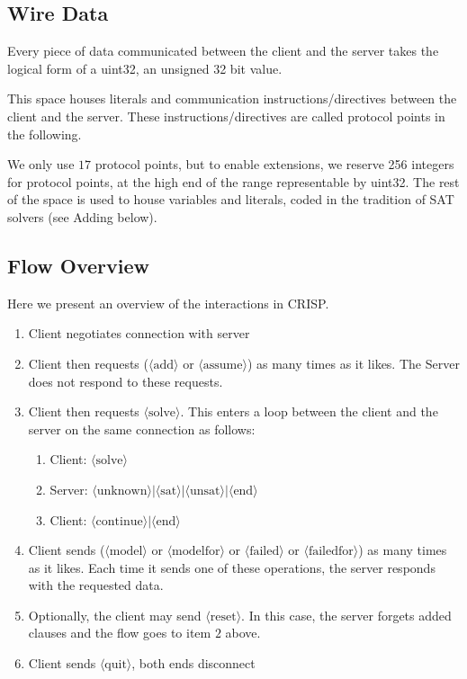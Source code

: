 \documentclass{article}
\newcommand\proto[1]{$\langle\mbox{#1}\rangle$}
\begin{document}
\subsection{Wire Data}

Every piece of data communicated between the client and the server takes the
logical form of a uint32, an unsigned 32 bit value.

This space houses literals and communication instructions/directives between
the client and the server.  These instructions/directives are called
protocol points in the following.

We only use $17$ protocol points, but to enable extensions, we
reserve 256 integers for protocol points, at the high end of the range
representable by uint32. The rest of the space is used to house variables
and literals, coded in the tradition of SAT solvers (see Adding below).

\subsection{Flow Overview}
\label{section:flow}

Here we present an overview of the interactions in CRISP.

\begin{enumerate}
\item Client negotiates connection with server
\item Client then requests (\proto{add} or \proto{assume}) as many times as it likes.
 The Server does not respond to these requests.
 \item Client then requests \proto{solve}.  This enters a loop between the client and the server on the same connection as
 follows:
	 \begin{enumerate}
		 \item Client: \proto{solve}
	 \item Server: \proto{unknown}$|$\proto{sat}$|$\proto{unsat}$|$\proto{end}
	 \item Client: \proto{continue}$|$\proto{end}
	 \end{enumerate}
 \item Client sends (\proto{model} or \proto{modelfor} or \proto{failed} or \proto{failedfor}) as many times as it likes.
 Each time it sends one of these operations, the server responds with the requested data.
 \item Optionally, the client may send \proto{reset}.  In this case, the server forgets added clauses and
	 the flow goes to item $2$ above.
 \item Client sends \proto{quit}, both ends disconnect
\end{enumerate}
\end{document}
